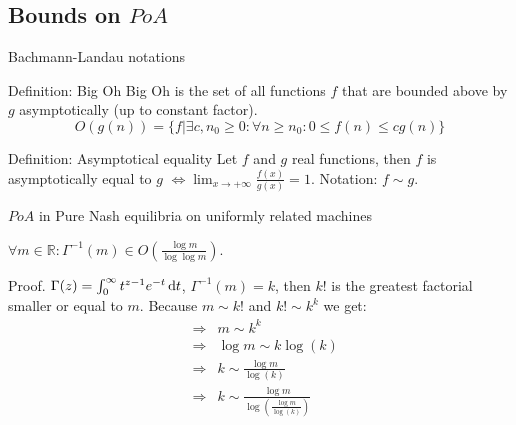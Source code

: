 \documentclass{beamer}
\newcommand{\R}{\mathbb{R}}
\begin{document}
\subsection{Bounds on $PoA$}
\begin{frame}{Bachmann-Landau notations}
\begin{block}{Definition: Big Oh}
Big Oh is the set of all functions $f$ that are bounded above by $g$ asymptotically (up to constant factor).
$$O(g(n)) = \{f|\exists c, n_0 \geq 0: \forall n \geq n_0 : 0 \leq f(n) \leq cg(n)\}$$
\end{block}
\begin{block}{Definition: Asymptotical equality}
Let $f$ and $g$ real functions, then $f$ is asymptotically equal to $g$ $\Leftrightarrow \displaystyle\lim_{x\rightarrow +\infty} \frac{f(x)}{g(x)}=1$. Notation: $f \sim g$.
\end{block}
\end{frame}

\begin{frame}{$PoA$ in Pure Nash equilibria on uniformly related machines}

\begin{lemma}
$\forall m \in \R: \Gamma^{-1}(m) \in O\left(\frac{\log m}{\log \log m}\right)$.
\end{lemma}
\begin{block}{Proof.}
$\Gamma(z) = \int_0^\infty  t^{z-1} e^{-t}\,{\rm d}t$, $\Gamma^{-1}(m) = k$, then $k!$ is the greatest factorial smaller or equal to $m$. Because $m \sim k!$ and $k! \sim k^k$ we get:
\vspace{-.8cm}
\begin{eqnarray*}
&\Rightarrow& m \sim k^{k} \\
&\Rightarrow& \log m \sim k\log(k) \\
&\Rightarrow& k \sim \frac{\log m}{\log(k)}\\
&\Rightarrow& k \sim \frac{\log m}{\log(\frac{\log m}{\log (k)})}
\end{eqnarray*}

\end{block}


\end{frame}
\end{document}
